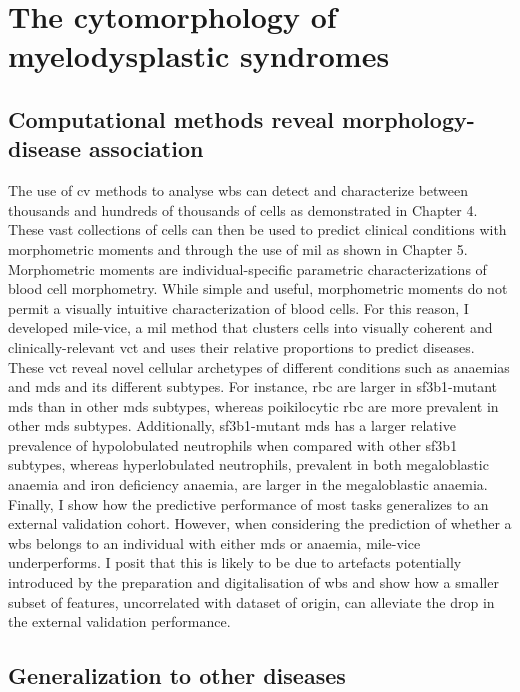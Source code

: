 \section{The cytomorphology of myelodysplastic syndromes} 

\subsection{Computational methods reveal morphology-disease association}

The use of \ac{cv} methods to analyse \ac{wbs} can detect and characterize between thousands and hundreds of thousands of cells as demonstrated in Chapter 4. These vast collections of cells can then be used to predict clinical conditions with morphometric moments and through the use of \ac{mil} as shown in Chapter 5. Morphometric moments are individual-specific parametric characterizations of blood cell morphometry. While simple and useful, morphometric moments do not permit a visually intuitive characterization of blood cells. For this reason, I developed \ac{mile-vice}, a \ac{mil} method that clusters cells into visually coherent and clinically-relevant \ac{vct} and uses their relative proportions to predict diseases. These \ac{vct} reveal novel cellular archetypes of different conditions such as anaemias and \ac{mds} and its different subtypes. For instance, \ac{rbc} are larger in \ac{sf3b1}-mutant \ac{mds} than in other \ac{mds} subtypes, whereas poikilocytic \ac{rbc} are more prevalent in other \ac{mds} subtypes. Additionally, \ac{sf3b1}-mutant \ac{mds} has a larger relative prevalence of hypolobulated neutrophils when compared with other \ac{sf3b1} subtypes, whereas hyperlobulated neutrophils, prevalent in both megaloblastic anaemia and iron deficiency anaemia, are larger in the megaloblastic anaemia. Finally, I show how the predictive performance of most tasks generalizes to an external validation cohort. However, when considering the prediction of whether a \ac{wbs} belongs to an individual with either \ac{mds} or anaemia, \ac{mile-vice} underperforms. I posit that this is likely to be due to artefacts potentially introduced by the preparation and digitalisation of \ac{wbs} and show how a smaller subset of features, uncorrelated with dataset of origin, can alleviate the drop in the external validation performance.

\subsection{Generalization to other diseases} 

